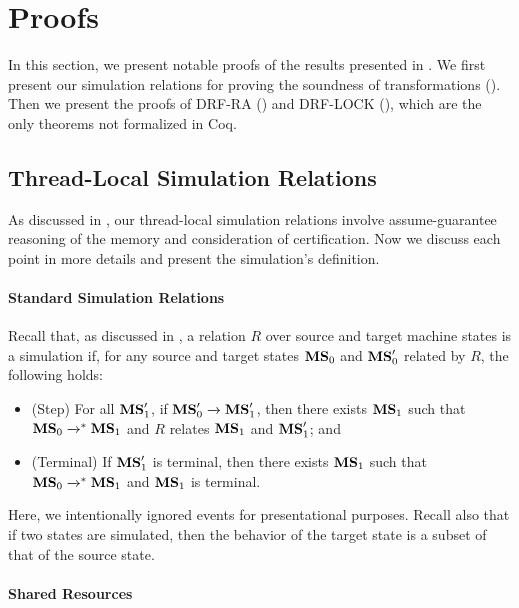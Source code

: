 \section{Proofs}
\label{sec:relaxed:proofs}

In this section, we present notable proofs of the results presented in .  We first
present our simulation relations for proving the soundness of transformations
().  Then we present the proofs of DRF-RA
() and DRF-LOCK (), which are the
only theorems not formalized in Coq.


\subsection{Thread-Local Simulation Relations}
\label{sec:relaxed:proofs:simulation}

As discussed in , our thread-local simulation relations involve
assume-guarantee reasoning of the memory and consideration of certification.  Now we discuss each
point in more details and present the simulation's definition.


\paragraph{Standard Simulation Relations}

Recall that, as discussed in , a relation $R$ over source and
target machine states is a simulation if, for any source and target states ${\mathbf{MS}}_0$ and
${\mathbf{MS}}'_0$ related by $R$, the following holds:
\begin{itemize}
\item (Step) For all ${\mathbf{MS}}'_1$, if ${\mathbf{MS}}'_0 \xrightarrow{} {\mathbf{MS}}'_1$, then there exists ${\mathbf{MS}}_1$
  such that ${\mathbf{MS}}_0 \xrightarrow{}^* {\mathbf{MS}}_1$ and $R$ relates ${\mathbf{MS}}_1$ and ${\mathbf{MS}}'_1$; and
\item (Terminal) If ${\mathbf{MS}}'_1$ is terminal, then there exists ${\mathbf{MS}}_1$ such that
  ${\mathbf{MS}}_0 \xrightarrow{}^* {\mathbf{MS}}_1$ and ${\mathbf{MS}}_1$ is terminal.
\end{itemize}
%
Here, we intentionally ignored events for presentational purposes.  Recall also that if two states
are simulated, then the behavior of the target state is a subset of that of the source state.


\paragraph{Shared Resources}

